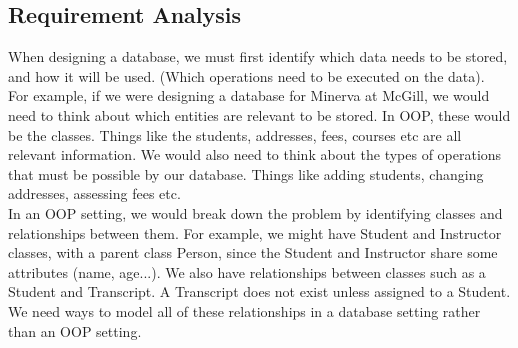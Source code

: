 \documentclass[12pt]{article}
\theoremstyle{definition}
\begin{document}
\subsection{Requirement Analysis}
When designing a database, we must first identify which data needs to be stored, and how it will be used. (Which operations need to be executed on the data).
\\ \linebreak
For example, if we were designing a database for Minerva at McGill, we would need to think about which entities are relevant to be stored. In OOP, these would be the classes. Things like the students, addresses, fees, courses etc are all relevant information. We would also need to think about the types of operations that must be possible by our database. Things like adding students, changing addresses, assessing fees etc.
\\ \linebreak
In an OOP setting, we would break down the problem by identifying classes and relationships between them. For example, we might have Student and Instructor classes, with a parent class Person, since the Student and Instructor share some attributes (name, age...). We also have relationships between classes such as a Student and Transcript. A Transcript does not exist unless assigned to a Student. We need ways to model all of these relationships in a database setting rather than an OOP setting.
\\ \linebreak
\end{document}
